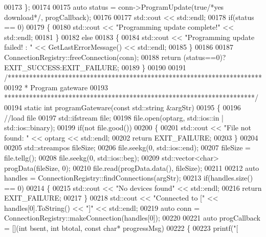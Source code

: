 \begin{DoxyCode}
{00173     \};
00174 
00175     \textcolor{keyword}{auto} status = conn->ProgramUpdate(\textcolor{keyword}{true}\textcolor{comment}{/*yes download*/}, progCallback);
00176 
00177     std::cout << std::endl;
00178     \textcolor{keywordflow}{if}(status == 0)
00179     \{
00180         std::cout << \textcolor{stringliteral}{"Programming update complete!"} << std::endl;
00181     \}
00182     \textcolor{keywordflow}{else}
00183     \{
00184         std::cout << \textcolor{stringliteral}{"Programming update failed! : "} << GetLastErrorMessage() << std::endl;
00185     \}
00186 
00187     ConnectionRegistry::freeConnection(conn);
00188     \textcolor{keywordflow}{return} (status==0)?EXIT\_SUCCESS:EXIT\_FAILURE;
00189 \}
00190 
00191 \textcolor{comment}{/***********************************************************************}
00192 \textcolor{comment}{ * Program gateware}
00193 \textcolor{comment}{ **********************************************************************/}
00194 \textcolor{keyword}{static} \textcolor{keywordtype}{int} programGateware(\textcolor{keyword}{const} std::string &argStr)
00195 \{
00196     \textcolor{comment}{//load file}
00197     std::ifstream file;
00198     file.open(optarg, std::ios::in | std::ios::binary);
00199     \textcolor{keywordflow}{if}(not file.good())
00200     \{
00201         std::cout << \textcolor{stringliteral}{"File not found: "} << optarg << std::endl;
00202         \textcolor{keywordflow}{return} EXIT\_FAILURE;
00203     \}
00204 
00205     std::streampos fileSize;
00206     file.seekg(0, std::ios::end);
00207     fileSize = file.tellg();
00208     file.seekg(0, std::ios::beg);
00209     std::vector<char> progData(fileSize, 0);
00210     file.read(progData.data(), fileSize);
00211 
00212     \textcolor{keyword}{auto} handles = ConnectionRegistry::findConnections(argStr);
00213     \textcolor{keywordflow}{if}(handles.size() == 0)
00214     \{
00215         std::cout << \textcolor{stringliteral}{"No devices found"} << std::endl;
00216         \textcolor{keywordflow}{return} EXIT\_FAILURE;
00217     \}
00218     std::cout << \textcolor{stringliteral}{"Connected to ["} << handles[0].ToString() << \textcolor{stringliteral}{"]"} << std::endl;
00219     \textcolor{keyword}{auto} conn = ConnectionRegistry::makeConnection(handles[0]);
00220 
00221     \textcolor{keyword}{auto} progCallback = [](\textcolor{keywordtype}{int} bsent, \textcolor{keywordtype}{int} btotal, \textcolor{keyword}{const} \textcolor{keywordtype}{char}* progressMsg)
00222     \{
00223         printf(\textcolor{stringliteral}{"[%
}}
\end{DoxyCode}
